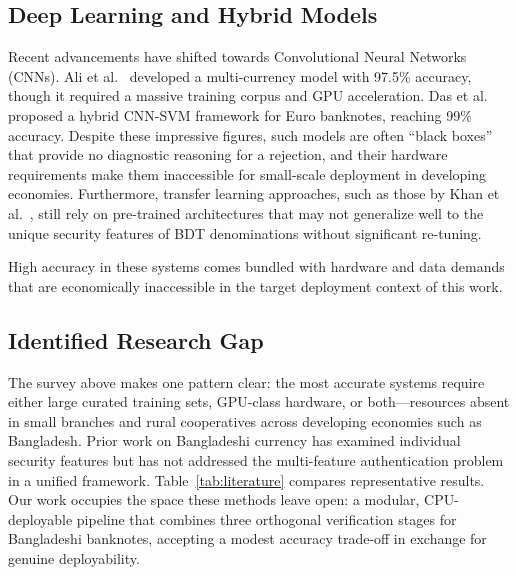 \documentclass[journal]{IEEEtran}
\begin{document}
\subsection{Deep Learning and Hybrid Models}

Recent advancements have shifted towards Convolutional Neural Networks (CNNs). Ali et al.~\cite{ali2021} developed a multi-currency model with 97.5\% accuracy, though it required a massive training corpus and GPU acceleration. Das et al.~\cite{das2022} proposed a hybrid CNN-SVM framework for Euro banknotes, reaching 99\% accuracy. Despite these impressive figures, such models are often ``black boxes'' that provide no diagnostic reasoning for a rejection, and their hardware requirements make them inaccessible for small-scale deployment in developing economies. Furthermore, transfer learning approaches, such as those by Khan et al.~\cite{khan2023}, still rely on pre-trained architectures that may not generalize well to the unique security features of BDT denominations without significant re-tuning.

High accuracy in these systems comes bundled with hardware and data demands that are economically inaccessible in the target deployment context of this work.

\subsection{Identified Research Gap}

The survey above makes one pattern clear: the most accurate systems require either large curated training sets, GPU-class hardware, or both---resources absent in small branches and rural cooperatives across developing economies such as Bangladesh. Prior work on Bangladeshi currency has examined individual security features but has not addressed the multi-feature authentication problem in a unified framework. Table~\ref{tab:literature} compares representative results. Our work occupies the space these methods leave open: a modular, CPU-deployable pipeline that combines three orthogonal verification stages for Bangladeshi banknotes, accepting a modest accuracy trade-off in exchange for genuine deployability.
\end{document}
